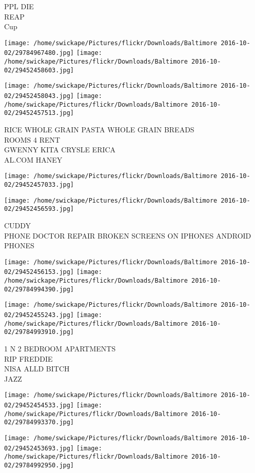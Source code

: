 \documentclass[10pt,letterpaper]{article}
\begin{document}
PPL DIE\\
REAP\\
Cup
\pagebreak

\texttt{[image: /home/swickape/Pictures/flickr/Downloads/Baltimore 2016-10-02/29784967480.jpg]}
\texttt{[image: /home/swickape/Pictures/flickr/Downloads/Baltimore 2016-10-02/29452458603.jpg]}

\texttt{[image: /home/swickape/Pictures/flickr/Downloads/Baltimore 2016-10-02/29452458043.jpg]}
\texttt{[image: /home/swickape/Pictures/flickr/Downloads/Baltimore 2016-10-02/29452457513.jpg]}

RICE WHOLE GRAIN PASTA WHOLE GRAIN BREADS\\
ROOMS 4 RENT\\
GWENNY KITA CRYSLE ERICA\\
AL.COM HANEY
\pagebreak

\texttt{[image: /home/swickape/Pictures/flickr/Downloads/Baltimore 2016-10-02/29452457033.jpg]}

\vspace{0.25in}
\texttt{[image: /home/swickape/Pictures/flickr/Downloads/Baltimore 2016-10-02/29452456593.jpg]}

CUDDY\\
PHONE DOCTOR REPAIR BROKEN SCREENS ON IPHONES ANDROID PHONES
\pagebreak

\texttt{[image: /home/swickape/Pictures/flickr/Downloads/Baltimore 2016-10-02/29452456153.jpg]}
\texttt{[image: /home/swickape/Pictures/flickr/Downloads/Baltimore 2016-10-02/29784994390.jpg]}

\texttt{[image: /home/swickape/Pictures/flickr/Downloads/Baltimore 2016-10-02/29452455243.jpg]}
\texttt{[image: /home/swickape/Pictures/flickr/Downloads/Baltimore 2016-10-02/29784993910.jpg]}

1 N 2 BEDROOM APARTMENTS\\
RIP FREDDIE\\
NISA ALLD BITCH\\
JAZZ
\pagebreak

\texttt{[image: /home/swickape/Pictures/flickr/Downloads/Baltimore 2016-10-02/29452454533.jpg]}
\texttt{[image: /home/swickape/Pictures/flickr/Downloads/Baltimore 2016-10-02/29784993370.jpg]}

\texttt{[image: /home/swickape/Pictures/flickr/Downloads/Baltimore 2016-10-02/29452453693.jpg]}
\texttt{[image: /home/swickape/Pictures/flickr/Downloads/Baltimore 2016-10-02/29784992950.jpg]}
\end{document}
